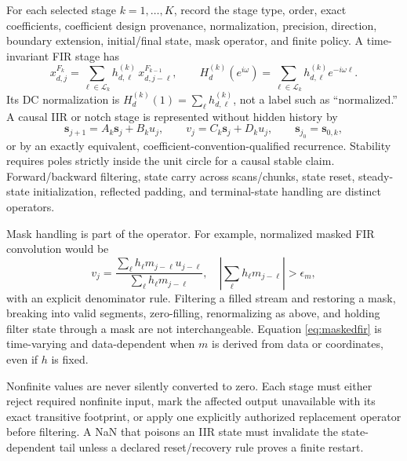 \documentclass[11pt]{article}
\begin{document}
For each selected stage $k=1,\ldots,K$, record the stage type, order, exact
coefficients, coefficient design provenance, normalization, precision,
direction, boundary extension, initial/final state, mask operator, and finite
policy.  A time-invariant FIR stage has
\begin{equation}
 x^{F_k}_{d,j}=\sum_{\ell\in\mathcal L_k}
     h^{(k)}_{d,\ell}\,x^{F_{k-1}}_{d,j-\ell},
 \qquad H^{(k)}_d(e^{i\omega})=
     \sum_{\ell\in\mathcal L_k}h^{(k)}_{d,\ell}e^{-i\omega\ell}.
 \tag{RTC-10}\label{eq:fir}
\end{equation}
Its DC normalization is $H^{(k)}_d(1)=\sum_\ell h^{(k)}_{d,\ell}$, not a
label such as ``normalized.''  A causal IIR or notch stage is represented
without hidden history by
\begin{equation}
 \mathbf s_{j+1}=A_k\mathbf s_j+B_k u_j,
 \qquad v_j=C_k\mathbf s_j+D_k u_j,
 \qquad \mathbf s_{j_0}=\mathbf s_{0,k},
 \tag{RTC-11}\label{eq:iir}
\end{equation}
or by an exactly equivalent, coefficient-convention-qualified recurrence.
Stability requires poles strictly inside the unit circle for a causal stable
claim.  Forward/backward filtering, state carry across scans/chunks, state
reset, steady-state initialization, reflected padding, and terminal-state
handling are distinct operators.

Mask handling is part of the operator.  For example, normalized masked FIR
convolution would be
\begin{equation}
 v_j=\frac{\sum_\ell h_\ell m_{j-\ell}u_{j-\ell}}
            {\sum_\ell h_\ell m_{j-\ell}},
 \quad \left|\sum_\ell h_\ell m_{j-\ell}\right|>\epsilon_m,
 \tag{RTC-12}\label{eq:maskedfir}
\end{equation}
with an explicit denominator rule.  Filtering a filled stream and restoring a
mask, breaking into valid segments, zero-filling, renormalizing as above, and
holding filter state through a mask are not interchangeable.  Equation
\eqref{eq:maskedfir} is time-varying and data-dependent when $m$ is derived
from data or coordinates, even if $h$ is fixed.

Nonfinite values are never silently converted to zero.  Each stage must either
reject required nonfinite input, mark the affected output unavailable with its
exact transitive footprint, or apply one explicitly authorized replacement
operator before filtering.  A NaN that poisons an IIR state must invalidate
the state-dependent tail unless a declared reset/recovery rule proves a finite
restart.
\end{document}
